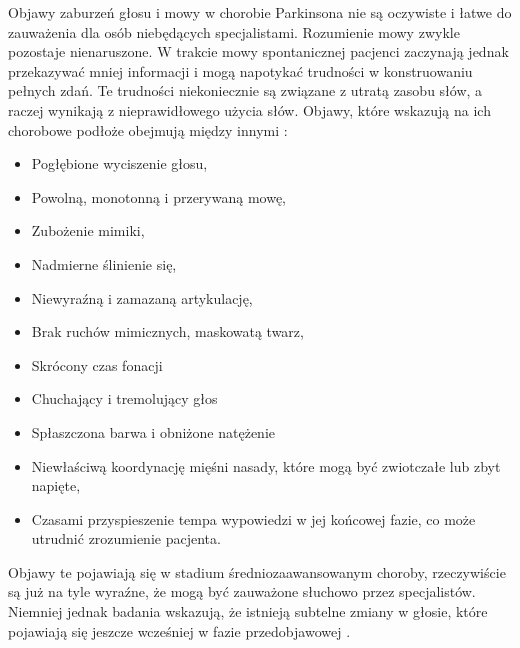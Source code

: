 \vspace{0.5cm}
Objawy zaburzeń głosu i mowy w chorobie Parkinsona nie są oczywiste i łatwe do zauważenia dla osób niebędących specjalistami.
Rozumienie mowy zwykle pozostaje nienaruszone.
W trakcie mowy spontanicznej pacjenci zaczynają jednak przekazywać mniej informacji i mogą napotykać trudności w konstruowaniu pełnych zdań.
Te trudności niekoniecznie są związane z utratą zasobu słów, a raczej wynikają z nieprawidłowego użycia słów.
Objawy, które wskazują na ich chorobowe podłoże obejmują między innymi \cite{Szurek_2018, Kuryłowicz_2019}:
\begin{itemize}[itemsep=0.5pt]
	\item Pogłębione wyciszenie głosu,
	\item Powolną, monotonną i przerywaną mowę,
	\item Zubożenie mimiki,
	\item Nadmierne ślinienie się,
	\item Niewyraźną i zamazaną artykulację,
	\item Brak ruchów mimicznych, maskowatą twarz,
	\item Skrócony czas fonacji
	\item Chuchający i tremolujący głos
	\item Spłaszczona barwa i obniżone natężenie
	\item Niewłaściwą koordynację mięśni nasady, które mogą być zwiotczałe lub zbyt napięte,
	\item Czasami przyspieszenie tempa wypowiedzi w jej końcowej fazie, co może utrudnić zrozumienie pacjenta.
\end{itemize}

Objawy te pojawiają się w stadium średniozaawansowanym choroby, rzeczywiście są już na tyle wyraźne, że mogą być zauważone
słuchowo przez specjalistów.
Niemniej jednak badania wskazują, że istnieją subtelne zmiany w głosie, które pojawiają się jeszcze wcześniej w fazie przedobjawowej \cite{2023_PD_voice}.

